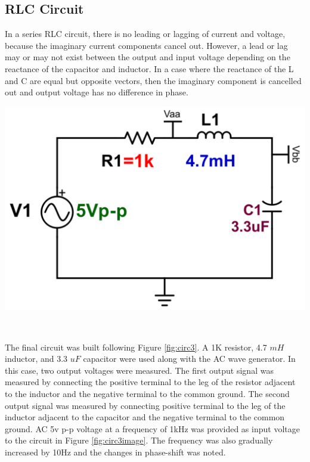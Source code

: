 \documentclass[journal]{IEEEtran}
\begin{document}
\subsection{RLC Circuit}
\noindent In a series RLC circuit, there is no leading or lagging of current and voltage, because the imaginary current components cancel out. However, a lead or lag may or may not exist between the output and input voltage depending on the reactance of the capacitor and inductor. In a case where the reactance of the L and C are equal but opposite vectors, then the imaginary component is cancelled out and output voltage has no difference in phase. 

\begingroup
    \centering
    \medskip
    \includegraphics[width=\columnwidth]{images/lab8_circuit3.png}
    \label{fig:circ3}
    \medskip
\endgroup

\\
\medskip

\noindent The final circuit was built following Figure \ref{fig:circ3}. A 1K resistor, 4.7 $mH$ inductor, and 3.3 $uF$ capacitor were used along with the AC wave generator. In this case, two output voltages were measured. The first output signal was measured by connecting the positive terminal to the leg of the resistor adjacent to the inductor and the negative terminal to the common ground. The second output signal was measured by connecting positive terminal to the leg of the inductor adjacent to the capacitor and the negative terminal to the common ground. AC 5v p-p voltage at a frequency of 1kHz was provided as input voltage to the circuit in Figure \ref{fig:circ3image}. The frequency was also gradually increased by 10Hz and the changes in phase-shift was noted.
\end{document}
